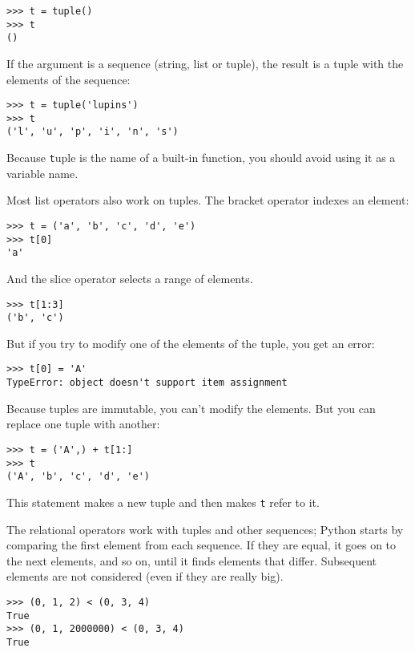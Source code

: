 \documentclass[
DIV=11,
fontsize=12,
twoside,
headinclude=false,
titlepage=firstiscover,
abstract=true,
headsepline=true,
footsepline=true,
chapterprefix=true, %
headings=big,
bibliography=totoc,%
captions=tableheading
]{scrbook}
\theoremstyle{definition}
\begin{document}
\begin{lstlisting}
>>> t = tuple()
>>> t
()
\end{lstlisting}
%
If the argument is a sequence (string, list or tuple), the result
is a tuple with the elements of the sequence:

\begin{lstlisting}
>>> t = tuple('lupins')
>>> t
('l', 'u', 'p', 'i', 'n', 's')
\end{lstlisting}
%
Because {\texttt tuple} is the name of a built-in function, you should
avoid using it as a variable name.

Most list operators also work on tuples.  The bracket operator
indexes an element:

\begin{lstlisting}
>>> t = ('a', 'b', 'c', 'd', 'e')
>>> t[0]
'a'
\end{lstlisting}
%
And the slice operator selects a range of elements.

\begin{lstlisting}
>>> t[1:3]
('b', 'c')
\end{lstlisting}
%
But if you try to modify one of the elements of the tuple, you get
an error:

\begin{lstlisting}
>>> t[0] = 'A'
TypeError: object doesn't support item assignment
\end{lstlisting}
%
Because tuples are immutable, you can't modify the elements.  But you
can replace one tuple with another:

\begin{lstlisting}
>>> t = ('A',) + t[1:]
>>> t
('A', 'b', 'c', 'd', 'e')
\end{lstlisting}
%
This statement makes a new tuple and then makes {\texttt t} refer to it.

The relational operators work with tuples and other sequences;
Python starts by comparing the first element from each
sequence.  If they are equal, it goes on to the next elements,
and so on, until it finds elements that differ.  Subsequent
elements are not considered (even if they are really big).

\begin{lstlisting}
>>> (0, 1, 2) < (0, 3, 4)
True
>>> (0, 1, 2000000) < (0, 3, 4)
True
\end{lstlisting}
\end{document}
